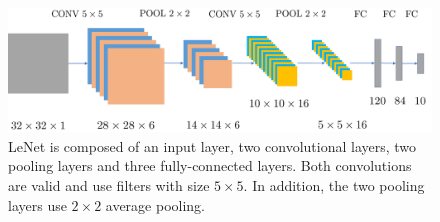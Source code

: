 %
%
%
%
%
%
%
%

\begin{figure}
\centering
\includegraphics[width=0.9 \textwidth]{LeNet}\caption{LeNet is composed of an input layer, two convolutional layers, two pooling layers and three fully-connected layers. Both convolutions are valid and use filters with size $5 \times 5$. In addition, the two pooling layers use $2 \times 2$ average pooling. \label{fig:CNN}}
\end{figure}

